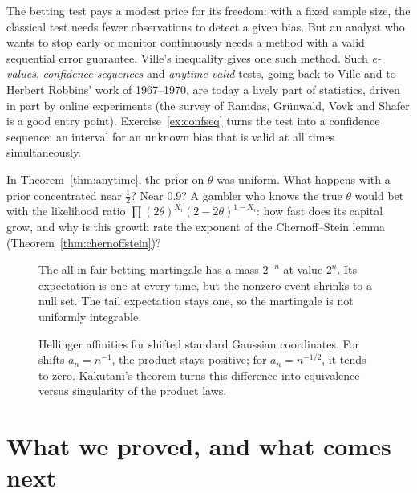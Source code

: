 The betting test pays a modest price for its freedom: with a fixed sample size, the classical test needs fewer observations to detect a given bias. But an analyst who wants to stop early or monitor continuously needs a method with a valid sequential error guarantee. Ville's inequality gives one such method. Such \emph{e-values}, \emph{confidence sequences} and \emph{anytime-valid} tests, going back to Ville and to Herbert Robbins'
work of 1967--1970, are today a lively part of statistics, driven in part by online experiments (the survey of Ramdas, Gr\"unwald, Vovk and Shafer is a good entry point). Exercise~\ref{ex:confseq} turns the test into a confidence sequence: an interval for an unknown
bias that is valid at all times simultaneously.

\begin{think}
In Theorem~\ref{thm:anytime}, the prior on $\theta$ was uniform. What happens with a prior concentrated near $\frac12$? Near $0.9$? A gambler who knows the true $\theta$ would bet with the likelihood ratio
$\prod(2\theta)^{X_i}(2-2\theta)^{1-X_i}$: how fast does its capital grow, and why is this growth rate the exponent of the Chernoff--Stein lemma (Theorem~\ref{thm:chernoffstein})?
\end{think}

\begin{figure}[ht]
\centering{}
\caption{The all-in fair betting martingale has a mass $2^{-n}$ at value $2^n$. Its expectation is one at every time, but the nonzero event shrinks to a null set. The tail expectation stays one, so the martingale is not uniformly integrable.}
\label{fig:v11-ch09-escaping-mass}
\end{figure}

\begin{figure}[ht]
\centering{}
\caption{Hellinger affinities for shifted standard Gaussian coordinates. For shifts $a_n=n^{-1}$, the product stays positive; for $a_n=n^{-1/2}$, it tends to zero. Kakutani's theorem turns this difference into equivalence versus singularity of the product laws.}
\label{fig:v11-ch09-affinity}
\end{figure}

\section{What we proved, and what comes next}

